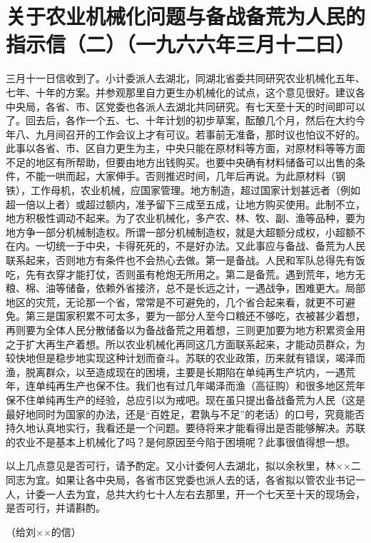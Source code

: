 \section[关于农业机械化问题与备战备荒为人民的指示信（二）（一九六六年三月十二曰）]{关于农业机械化问题与备战备荒为人民的指示信（二）（一九六六年三月十二曰）}


三月十一日信收到了。小计委派人去湖北，同湖北省委共同研究农业机械化五年、七年、十年的方案。并参观那里自力更生办机械化的试点，这个意见很好。建议各中央局，各省、市、区党委也各派人去湖北共同研究。有七天至十天的时间即可以了。回去后，各作一个五、七、十年计划的初步草案，酝酿几个月，然后在大约今年八、九月间召开的工作会议上才有可议。若事前无准备，那时议也怕议不好的。此事以各省、市、区自力更生为主，中央只能在原材料等方面，对原材料等等方面不足的地区有所帮助，但要由地方出钱购买。也要中央确有材料储备可以出售的条件，不能一哄而起，大家伸手。否则推迟时间，几年后再说。为此原材料（钢铁），工作母机，农业机械，应国家管理。地方制造，超过国家计划甚远者（例如超一倍以上者）或超过额内，准予留下三成至五成，让地方购买使用。此制不立，地方积极性调动不起来。为了农业机械化，多产农、林、牧、副、渔等品种，要为地方争一部分机械制造权。所谓一部分机械制造权，就是大超额分成权，小超额不在内。一切统一于中央，卡得死死的，不是好办法。又此事应与备战、备荒为人民联系起来，否则地方有条件也不会热心去做。第一是备战。人民和军队总得先有饭吃，先有衣穿才能打仗，否则虽有枪炮无所用之。第二是备荒。遇到荒年，地方无粮、棉、油等储备，依赖外省接济，总不是长远之计，一遇战争，困难更大。局部地区的灾荒，无论那一个省，常常是不可避免的，几个省合起来看，就更不可避免。第三是国家积累不可太多，要为一部分人至今口粮还不够吃，衣被甚少着想，再则要为全体人民分散储备以为备战备荒之用着想，三则更加要为地方积累资金用之于扩大再生产着想。所以农业机械化再同这几方面联系起来，才能动员群众，为较快地但是稳步地实现这种计划而奋斗。苏联的农业政策，历来就有错误，竭泽而渔，脱离群众，以至造成现在的困境，主要是长期陷在单纯再生产坑内，一遇荒年，连单纯再生产也保不住。我们也有过几年竭泽而渔（高征购）和很多地区荒年保不住单纯再生产的经验，总应引以为戒吧。现在虽只提出备战备荒为人民（这是最好地同时为国家的办法，还是“百姓足，君孰与不足”的老话）的口号，究竟能否持久地认真地实行，我看还是一个问题。要待将来才能看得出是否能够解决。苏联的农业不是基本上机械化了吗？是何原因至今陷于困境呢？此事很值得想一想。

以上几点意见是否可行，请予酌定。又小计委何人去湖北，拟以余秋里，林××二同志为宜。如果让各中央局，各省市区党委也派人去的话，各省拟以管农业书记一人，计委一人去为宜，总共大约七十人左右去那里，开一个七天至十天的现场会，是否可行，并请斟酌。

（给刘××的信）


